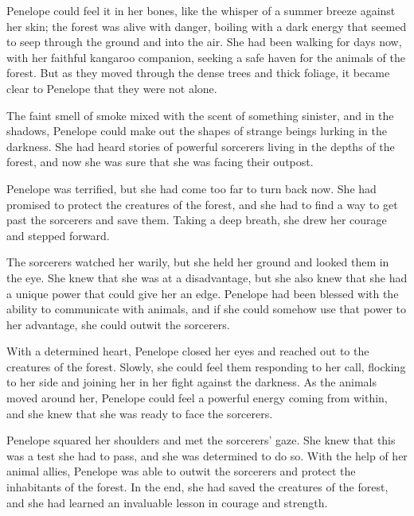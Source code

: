

Penelope could feel it in her bones, like the whisper of a summer breeze against her skin; the forest was alive with danger, boiling with a dark energy that seemed to seep through the ground and into the air. She had been walking for days now, with her faithful kangaroo companion, seeking a safe haven for the animals of the forest. But as they moved through the dense trees and thick foliage, it became clear to Penelope that they were not alone.

The faint smell of smoke mixed with the scent of something sinister, and in the shadows, Penelope could make out the shapes of strange beings lurking in the darkness. She had heard stories of powerful sorcerers living in the depths of the forest, and now she was sure that she was facing their outpost. 

Penelope was terrified, but she had come too far to turn back now. She had promised to protect the creatures of the forest, and she had to find a way to get past the sorcerers and save them. Taking a deep breath, she drew her courage and stepped forward.

The sorcerers watched her warily, but she held her ground and looked them in the eye. She knew that she was at a disadvantage, but she also knew that she had a unique power that could give her an edge. Penelope had been blessed with the ability to communicate with animals, and if she could somehow use that power to her advantage, she could outwit the sorcerers.

With a determined heart, Penelope closed her eyes and reached out to the creatures of the forest. Slowly, she could feel them responding to her call, flocking to her side and joining her in her fight against the darkness. As the animals moved around her, Penelope could feel a powerful energy coming from within, and she knew that she was ready to face the sorcerers.

Penelope squared her shoulders and met the sorcerers’ gaze. She knew that this was a test she had to pass, and she was determined to do so. With the help of her animal allies, Penelope was able to outwit the sorcerers and protect the inhabitants of the forest. In the end, she had saved the creatures of the forest, and she had learned an invaluable lesson in courage and strength.